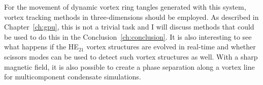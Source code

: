 For the movement of dynamic vortex ring tangles generated with this system, vortex tracking methods in three-dimensions should be employed.
As described in Chapter~\ref{ch:gpu}, this is not a trivial task and I will discuss methods that could be used to do this in the Conclusion~\ref{ch:conclusion}.
It is also interesting to see what happens if the HE$_{21}$ vortex structures are evolved in real-time and whether scissors modes can be used to detect such vortex structures as well.
With a sharp magnetic field, it is also possible to create a phase separation along a vortex line for multicomponent condensate simulations.
